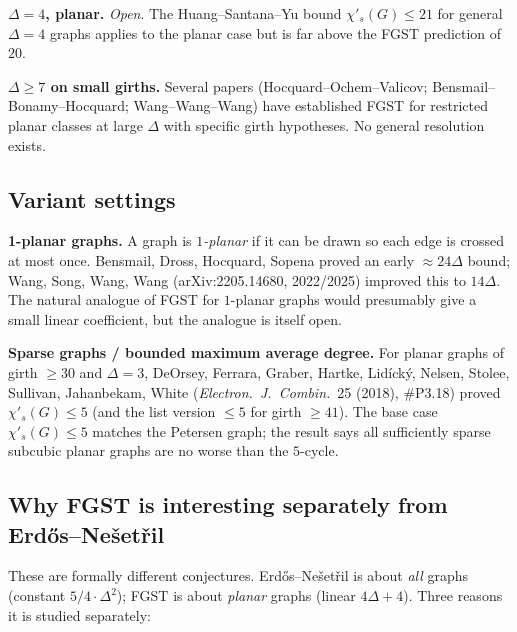 \documentclass[11pt]{article}
\newcommand{\sci}{\chi'_s}
\begin{document}
\textbf{$\Delta = 4$, planar.} \emph{Open}. The Huang--Santana--Yu
bound $\sci(G) \leq 21$ for general $\Delta = 4$ graphs applies to
the planar case but is far above the FGST prediction of $20$.

\textbf{$\Delta \geq 7$ on small girths.} Several papers
(Hocquard--Ochem--Valicov; Bensmail--Bonamy--Hocquard;
Wang--Wang--Wang) have established FGST for restricted planar
classes at large $\Delta$ with specific girth hypotheses.
No general resolution exists.

\subsection*{Variant settings}

\textbf{1-planar graphs.} A graph is \emph{$1$-planar} if it can be
drawn so each edge is crossed at most once. Bensmail, Dross,
Hocquard, Sopena proved an early $\approx 24 \Delta$ bound; Wang,
Song, Wang, Wang (arXiv:2205.14680, 2022/2025) improved this to
$14 \Delta$. The natural analogue of FGST for $1$-planar graphs
would presumably give a small linear coefficient, but the
analogue is itself open.

\textbf{Sparse graphs / bounded maximum average degree.} For planar
graphs of girth $\geq 30$ and $\Delta = 3$, DeOrsey, Ferrara, Graber,
Hartke, Lid\'ick\'y, Nelsen, Stolee, Sullivan, Jahanbekam, White
(\emph{Electron.\ J.\ Combin.}\ 25 (2018), \#P3.18) proved $\sci(G) \leq 5$
(and the list version $\leq 5$ for girth $\geq 41$). The base case
$\sci(G) \leq 5$ matches the Petersen graph; the result says all
sufficiently sparse subcubic planar graphs are no worse than the
$5$-cycle.

\subsection*{Why FGST is interesting separately from Erd\H{o}s--Ne\v{s}et\v{r}il}

These are formally different conjectures. Erd\H{o}s--Ne\v{s}et\v{r}il is
about \emph{all} graphs (constant $5/4 \cdot \Delta^2$); FGST is
about \emph{planar} graphs (linear $4\Delta + 4$). Three reasons it
is studied separately:
\end{document}
